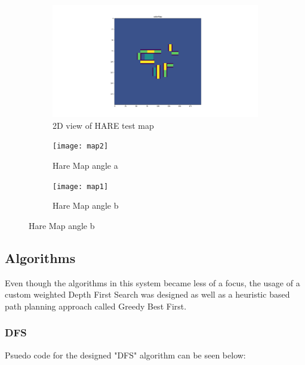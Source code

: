 \begin{figure}[H]
    \begin{center}
    \begin{subfigure}[b]{0.45\textwidth}
        \includegraphics[width=\textwidth]{2DHAREMap}
        \caption{2D view of HARE test map}
        \label{fig:2D}
    \end{subfigure}
    \begin{subfigure}[b]{0.25\textwidth}
        \texttt{[image: map2]}
        \caption{Hare Map angle a}
        \label{fig:3D1}
    \end{subfigure}
    \begin{subfigure}[b]{0.25\textwidth}
        \texttt{[image: map1]}
        \caption{Hare Map angle b}
        \label{fig:3D2}
    \end{subfigure}
  \end{center}
\end{figure}


\subsection{Algorithms}

Even though the algorithms in this system became less of a focus,
the usage of a custom weighted Depth First Search was designed as well as a
heuristic based path planning approach called Greedy Best First.

\subsubsection{DFS}

Psuedo code for the designed "DFS" algorithm can be seen below:

